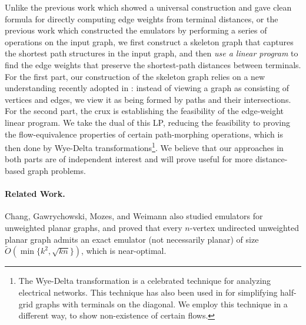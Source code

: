 \documentclass[11pt]{article}
\begin{document}
Unlike the previous work \cite{ChangO20} which showed a universal construction and gave clean formula for directly computing edge weights from terminal distances, or the previous work \cite{goranci2020improved,krauthgamer2014preserving} which constructed the emulators by performing a series of operations on the input graph, we first construct a skeleton graph that captures the shortest path structures in the input graph, and then \emph{use a linear program} to find the edge weights that preserve the shortest-path distances between terminals.
For the first part, our construction of the skeleton graph relies on a new understanding recently adopted in \cite{chen2025path}: instead of viewing a graph as consisting of vertices and edges, we view it as being formed by paths and their intersections.
For the second part, the crux is establishing the feasibility of the edge-weight linear program. We take the dual of this LP, reducing the feasibility to proving the flow-equivalence properties of certain path-morphing operations, which is then done by Wye-Delta transformations\footnote{The Wye-Delta transformation is a celebrated technique for analyzing electrical networks. This technique has also been used in \cite{goranci2020improved} for simplifying half-grid graphs with terminals on the diagonal. We employ this technique in a different way, to show non-existence of certain flows.}. We believe that our approaches in both parts are of independent interest and will prove useful for more distance-based graph problems.




\paragraph{Related Work.}
Chang, Gawrychowski, Mozes, and Weimann \cite{chang2018near} also studied emulators for unweighted planar graphs, and proved that every $n$-vertex undirected unweighted planar graph admits an exact emulator (not necessarily planar) of size $\tilde O(\min\{k^2,\sqrt{kn}\})$, which is near-optimal.

\end{document}
